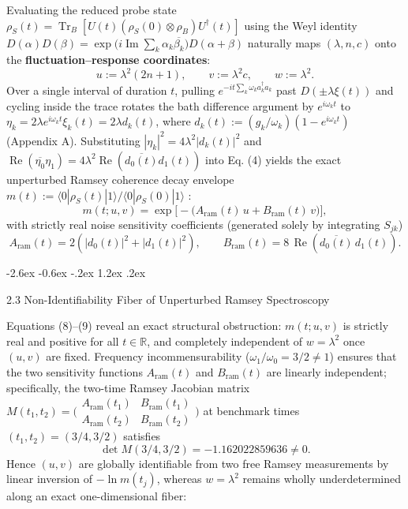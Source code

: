 \documentclass[11pt,letterpaper]{article}
\makeatletter
\renewcommand\subsection{\@startsection{subsection}{2}{\z@}%
  {-2.6ex \@plus -0.6ex \@minus -.2ex}%
  {1.2ex \@plus .2ex}%
  {\normalfont\large\bfseries\raggedright\hyphenpenalty=10000}}
\theoremstyle{definition}
\makeatother
\begin{document}
Evaluating the reduced probe state
\(\rho_S(t) = \operatorname{Tr}_B[U(t)(\rho_S(0) \otimes \rho_B)U^\dagger(t)]\)
using the Weyl identity
\(D(\alpha)D(\beta) = \exp\!\big(i\operatorname{Im}\sum_k \alpha_k \overline{\beta_k}\big) D(\alpha+\beta)\)
naturally maps \((\lambda, n, c)\) onto the
\textbf{fluctuation--response coordinates}:
\[u := \lambda^2 (2n + 1), \qquad v := \lambda^2 c, \qquad w := \lambda^2.
\tag{7}\] Over a single interval of duration \(t\), pulling
\(e^{-i t \sum_k \omega_k a_k^\dagger a_k}\) past
\(D(\pm\lambda\xi(t))\) and cycling inside the trace rotates the bath
difference argument by \(e^{i\omega_k t}\) to
\(\eta_k = 2\lambda e^{i\omega_k t}\xi_k(t) = 2\lambda d_k(t)\), where
\(d_k(t) := (g_k/\omega_k)(1 - e^{i\omega_k t})\) (Appendix A).
Substituting \(|\eta_k|^2 = 4\lambda^2|d_k(t)|^2\) and
\(\operatorname{Re}(\overline{\eta_0}\eta_1) = 4\lambda^2\operatorname{Re}(\overline{d_0(t)}d_1(t))\)
into Eq. (4) yields the exact unperturbed Ramsey coherence decay
envelope
\(m(t) := \langle 0 | \rho_S(t) | 1 \rangle / \langle 0 | \rho_S(0) | 1 \rangle\)
\citep{luczka1990, palma1996}:
\[m(t; u, v) = \exp\!\Big[-\big(A_{\mathrm{ram}}(t)\, u + B_{\mathrm{ram}}(t)\, v\big)\Big],
\tag{8}\] with strictly real noise sensitivity coefficients (generated
solely by integrating \(S_{jk}\))
\[A_{\mathrm{ram}}(t) = 2\left(|d_0(t)|^2 + |d_1(t)|^2\right), \qquad B_{\mathrm{ram}}(t) = 8\,\operatorname{Re}\!\left(\overline{d_0(t)}\,d_1(t)\right).
\tag{9}\]

\subsection{2.3 Non-Identifiability Fiber of Unperturbed Ramsey
Spectroscopy}\label{non-identifiability-fiber-of-unperturbed-ramsey-spectroscopy}

Equations (8)--(9) reveal an exact structural obstruction:
\(m(t; u, v)\) is strictly real and positive for all
\(t \in \mathbb{R}\), and completely independent of \(w = \lambda^2\)
once \((u, v)\) are fixed. Frequency incommensurability
(\(\omega_1/\omega_0 = 3/2 \neq 1\)) ensures that the two sensitivity
functions \(A_{\mathrm{ram}}(t)\) and \(B_{\mathrm{ram}}(t)\) are
linearly independent; specifically, the two-time Ramsey Jacobian matrix
\(M(t_1, t_2) = \bigl(\begin{smallmatrix} A_{\mathrm{ram}}(t_1) & B_{\mathrm{ram}}(t_1) \\ A_{\mathrm{ram}}(t_2) & B_{\mathrm{ram}}(t_2) \end{smallmatrix}\bigr)\)
at benchmark times \((t_1, t_2) = (3/4, 3/2)\) satisfies
\[\det M(3/4, 3/2) = -1.162022859636 \neq 0.
\tag{10}\] Hence \((u, v)\) are globally identifiable from two free
Ramsey measurements by linear inversion of \(-\ln m(t_j)\), whereas
\(w = \lambda^2\) remains wholly underdetermined along an exact
one-dimensional fiber:
\end{document}
